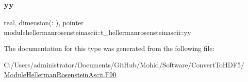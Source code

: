 \subsubsection{\texorpdfstring{yy}{yy}}
{\footnotesize\ttfamily real, dimension(\+:  ), pointer modulehellermanrosensteinascii\+::t\+\_\+hellermanrosensteinascii\+::yy\hspace{0.3cm}{\ttfamily [private]}}



The documentation for this type was generated from the following file\+:\begin{DoxyCompactItemize}
\item 
C\+:/\+Users/administrator/\+Documents/\+Git\+Hub/\+Mohid/\+Software/\+Convert\+To\+H\+D\+F5/\mbox{\hyperlink{_module_hellerman_rosenstein_ascii_8_f90}{Module\+Hellerman\+Rosenstein\+Ascii.\+F90}}\end{DoxyCompactItemize}
